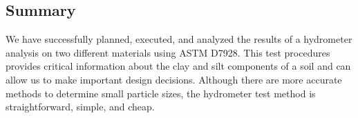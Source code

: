 \documentclass[12pt]{article}
\begin{document}
\subsection{Summary}
We have successfully planned, executed, and analyzed the results of a hydrometer analysis on two different materials using ASTM D7928. This test procedures provides critical information about the clay and silt components of a soil and can allow us to make important design decisions. Although there are more accurate methods to determine small particle sizes, the hydrometer test method is straightforward, simple, and cheap.

%
%

\pagebreak
\end{document}

